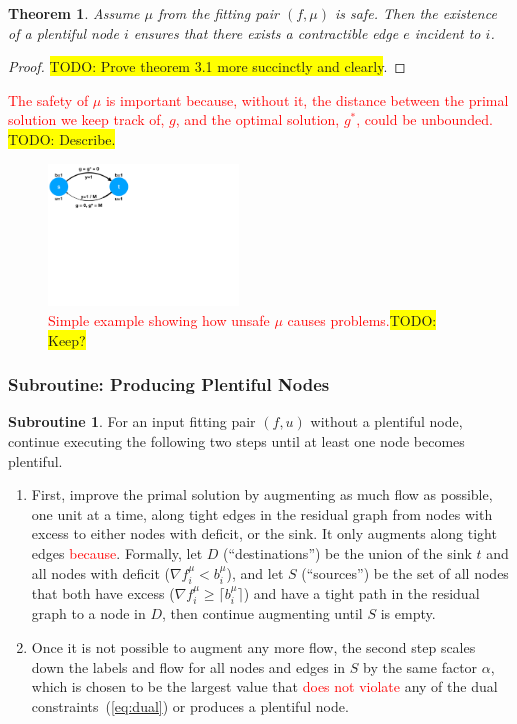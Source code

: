 \documentclass[11pt]{article}
\newtheorem{theorem}{Theorem}[section]
\theoremstyle{definition}
\theoremstyle{definition}
\newtheorem{subroutine}{Subroutine}
\newcommand{\rewrite}[1]{\textcolor{red}{#1}}
\newcommand{\todo}[1]{\colorbox{yellow}{TODO: #1}}
\begin{document}
\begin{theorem} Assume $\mu$ from the fitting pair $(f,\mu)$ is safe.
Then the existence of a plentiful node $i$ ensures
that there exists a contractible edge $e$ incident to $i$.
\end{theorem}
\begin{proof}
\todo{Prove theorem 3.1 more succinctly and clearly}.
\end{proof}

\rewrite{The safety of $\mu$ is important because, without it, the distance between
the primal solution we keep track of, $g$, and the optimal solution, $g^*$, could
be unbounded.} \todo{Describe.}

\begin{figure}[h]
\centering
\includegraphics[width=0.45\textwidth]{figs/unsafe.pdf}
\caption{
\label{fig:unsafe}
\rewrite{Simple example showing how unsafe $\mu$ causes problems.}\todo{Keep?}
}
\end{figure}

\subsubsection{Subroutine: Producing Plentiful Nodes}
\label{sec:sub-ppn}

\begin{subroutine}
For an input fitting pair $(f,u)$ without a plentiful node,
continue executing the following two steps until at least one node becomes
plentiful.
\begin{enumerate}
\item First, improve the primal solution by augmenting as much flow as possible,
one unit at a time, along tight edges in the residual graph 
from nodes with excess to either nodes with deficit, or the sink.
It only augments along tight edges \rewrite{because}. Formally, let
$D$ (``destinations'') be the union of the sink $t$ and all nodes with 
deficit ($\nabla f_i^{\mu} < b_i^{\mu}$), and let $S$ (``sources'') be
the set of all nodes that both have excess ($\nabla f_i^{\mu} \ge \lceil b_i^{\mu} \rceil$)
and have a tight path in the residual graph to a node in $D$, then
continue augmenting until $S$ is empty.
\item Once it is not possible to augment any more flow, the second step scales down
the labels and flow for all nodes and edges in $S$ by the same factor $\alpha$,
which is chosen to be the largest value that \rewrite{does not violate} any of the dual
constraints~(\ref{eq:dual}) or produces a plentiful node.
\end{enumerate}
\end{subroutine}
\end{document}

